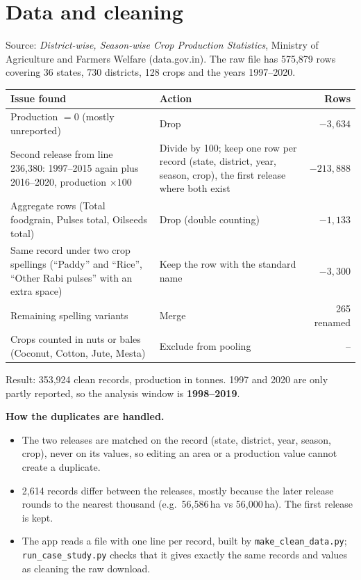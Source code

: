 \documentclass[11pt,a4paper]{article}
\begin{document}
\section{Data and cleaning}
Source: \emph{District-wise, Season-wise Crop Production Statistics}, Ministry of Agriculture
and Farmers Welfare (data.gov.in). The raw file has 575,879 rows covering 36 states,
730 districts, 128 crops and the years 1997--2020.

\begin{center}
\begin{tabularx}{\textwidth}{>{\raggedright\arraybackslash}X >{\raggedright\arraybackslash}X r}
\toprule
Issue found & Action & Rows \\
\midrule
Production $= 0$ (mostly unreported) & Drop & $-3{,}634$ \\
Second release from line 236,380: 1997--2015 again plus 2016--2020, production $\times100$
  & Divide by 100; keep one row per record (state, district, year, season, crop), the first
    release where both exist & $-213{,}888$ \\
Aggregate rows (Total foodgrain, Pulses total, Oilseeds total) & Drop (double counting) & $-1{,}133$ \\
Same record under two crop spellings (``Paddy'' and ``Rice'', ``Other Rabi pulses'' with an
  extra space) & Keep the row with the standard name & $-3{,}300$ \\
Remaining spelling variants & Merge & 265 renamed \\
Crops counted in nuts or bales (Coconut, Cotton, Jute, Mesta) & Exclude from pooling & -- \\
\bottomrule
\end{tabularx}
\end{center}

Result: 353,924 clean records, production in tonnes. 1997 and 2020 are only partly reported,
so the analysis window is \textbf{1998--2019}.

\textbf{How the duplicates are handled.}
\begin{itemize}
  \item The two releases are matched on the record (state, district, year, season, crop),
        never on its values, so editing an area or a production value cannot create a duplicate.
  \item 2,614 records differ between the releases, mostly because the later release rounds
        to the nearest thousand (e.g.\ 56,586\,ha vs 56,000\,ha). The first release is kept.
  \item {\sloppy The app reads a file with one line per record, built by \texttt{make\_clean\_data.py};
        \texttt{run\_case\_study.py} checks that it gives exactly the same records and values
        as cleaning the raw download.\par}
\end{itemize}
\end{document}

